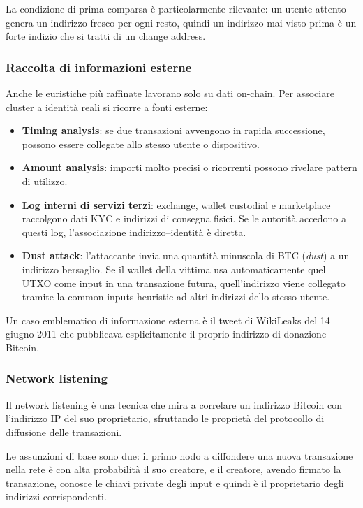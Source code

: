\documentclass[
  italian,
  openany]{book}
\providecommand{\tightlist}{%
  \setlength{\itemsep}{0pt}\setlength{\parskip}{0pt}}
\begin{document}
La condizione di prima comparsa è particolarmente rilevante: un utente
attento genera un indirizzo fresco per ogni resto, quindi un indirizzo
mai visto prima è un forte indizio che si tratti di un change address.

\subsubsection{Raccolta di informazioni
esterne}\label{raccolta-di-informazioni-esterne}

Anche le euristiche più raffinate lavorano solo su dati on-chain. Per
associare cluster a identità reali si ricorre a fonti esterne:

\begin{itemize}
\tightlist
\item
  \textbf{Timing analysis}: se due transazioni avvengono in rapida
  successione, possono essere collegate allo stesso utente o
  dispositivo.
\item
  \textbf{Amount analysis}: importi molto precisi o ricorrenti possono
  rivelare pattern di utilizzo.
\item
  \textbf{Log interni di servizi terzi}: exchange, wallet custodial e
  marketplace raccolgono dati KYC e indirizzi di consegna fisici. Se le
  autorità accedono a questi log, l'associazione indirizzo--identità è
  diretta.
\item
  \textbf{Dust attack}: l'attaccante invia una quantità minuscola di BTC
  (\emph{dust}) a un indirizzo bersaglio. Se il wallet della vittima usa
  automaticamente quel UTXO come input in una transazione futura,
  quell'indirizzo viene collegato tramite la common inputs heuristic ad
  altri indirizzi dello stesso utente.
\end{itemize}

Un caso emblematico di informazione esterna è il tweet di WikiLeaks del
14 giugno 2011 che pubblicava esplicitamente il proprio indirizzo di
donazione Bitcoin.

\subsubsection{Network listening}\label{network-listening}

Il network listening è una tecnica che mira a correlare un indirizzo
Bitcoin con l'indirizzo IP del suo proprietario, sfruttando le proprietà
del protocollo di diffusione delle transazioni.

Le assunzioni di base sono due: il primo nodo a diffondere una nuova
transazione nella rete è con alta probabilità il suo creatore, e il
creatore, avendo firmato la transazione, conosce le chiavi private degli
input e quindi è il proprietario degli indirizzi corrispondenti.
\end{document}
